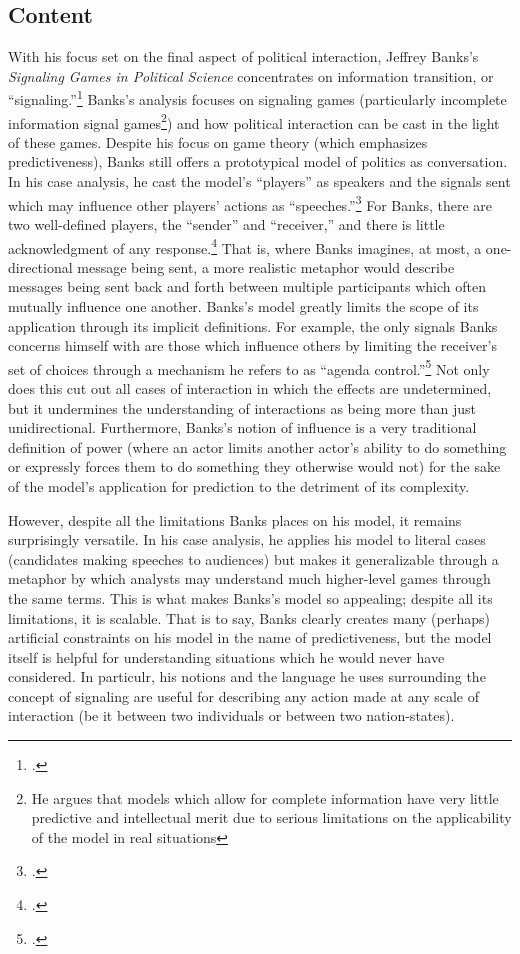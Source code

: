 \documentclass{article}
\begin{document}
\subsection{Content}
With his focus set on the final aspect of political interaction, Jeffrey Banks's \emph{Signaling Games in Political Science} concentrates on information transition, or ``signaling.''\footcite{banks91} 
Banks's analysis focuses on signaling games (particularly incomplete information signal games\footnote{He argues that models which allow for complete information have very little predictive and intellectual merit due to serious limitations on the applicability of the model in real situations}) and how political interaction can be cast in the light of these games. 
Despite his focus on game theory (which emphasizes predictiveness), Banks still offers a prototypical model of politics as conversation. 
In his case analysis, he cast the model's ``players'' as speakers and the signals sent which may influence other players' actions as ``speeches.''\footcite[37]{banks91} 
For Banks, there are two well-defined players, the ``sender'' and ``receiver,'' and there is little acknowledgment of any response.\footcite[4]{banks91} 
That is, where Banks imagines, at most, a one-directional message being sent, a more realistic metaphor would describe messages being sent back and forth between multiple participants which often mutually influence one another. 
Banks's model greatly limits the scope of its application through its implicit definitions. 
For example, the only signals Banks concerns himself with are those which influence others by limiting the receiver's set of choices through a mechanism he refers to as ``agenda control.''\footcite[3]{banks91} 
Not only does this cut out all cases of interaction in which the effects are undetermined, but it undermines the understanding of interactions as being more than just unidirectional. 
Furthermore, Banks's notion of influence is a very traditional definition of power (where an actor limits another actor's ability to do something or expressly forces them to do something they otherwise would not) for the sake of the model's application for prediction to the detriment of its complexity. 

However, despite all the limitations Banks places on his model, it remains surprisingly versatile. 
In his case analysis, he applies his model to literal cases (candidates making speeches to audiences) but makes it generalizable through a metaphor by which analysts may understand much higher-level games through the same terms. 
This is what makes Banks's model so appealing; despite all its limitations, it is scalable.
That is to say, Banks clearly creates many (perhaps) artificial constraints on his model in the name of predictiveness, but the model itself is helpful for understanding situations which he would never have considered.
In particulr, his notions and the language he uses surrounding the concept of signaling are useful for describing any action made at any scale of interaction (be it between two individuals or between two nation-states).
\end{document}
